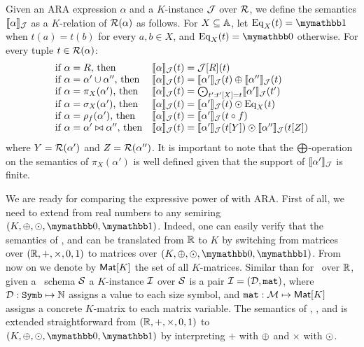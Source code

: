Given an ARA expression $\alpha$ and a $K$-instance $\mathcal{J}$ over $\mathcal{R}$, we define the semantics $\llbracket \alpha \rrbracket_{\mathcal{J}}$ as a $K$-relation of $\mathcal{R}(\alpha)$ as follows. For $X \subseteq \mathbb{A}$, let $\operatorname{Eq}_X(t) = \kone$ when $t(a) = t(b)$ for every $a, b \in X$, and $\operatorname{Eq}_X(t) = \kzero$ otherwise. For every tuple $t \in \mathcal{R}(\alpha)$:
$$
\begin{array}{ll}
\text{if $\alpha = R$, then} & \llbracket \alpha \rrbracket_{\mathcal{J}}(t) = \mathcal{J}[R](t) \\
\text{if $\alpha = \alpha' \cup \alpha''$, then} & \llbracket \alpha \rrbracket_{\mathcal{J}}(t) = \llbracket \alpha' \rrbracket_{\mathcal{J}}(t) \oplus \llbracket \alpha'' \rrbracket_{\mathcal{J}}(t)  \\
\text{if $\alpha = \pi_X(\alpha')$, then} & \llbracket \alpha \rrbracket_{\mathcal{J}}(t) = \bigodot_{t': t'[X] = t} \llbracket \alpha' \rrbracket_{\mathcal{J}}(t') \\
\text{if $\alpha = \sigma_X(\alpha')$, then} & \llbracket \alpha \rrbracket_{\mathcal{J}}(t) = 
\llbracket \alpha' \rrbracket_{\mathcal{J}}(t) \odot \operatorname{Eq}_X(t)  \\
\text{if $\alpha = \rho_f(\alpha')$, then} & \llbracket \alpha \rrbracket_{\mathcal{J}}(t) = 
\llbracket \alpha' \rrbracket_{\mathcal{J}}(t \circ f)  
\\
\text{if $\alpha = \alpha' \bowtie \alpha''$, then} & \llbracket \alpha \rrbracket_{\mathcal{J}}(t) =  \llbracket \alpha' \rrbracket_{\mathcal{J}}(t[Y]) \odot  \llbracket \alpha'' \rrbracket_{\mathcal{J}}(t[Z])
\end{array}
$$
where $Y = \mathcal{R}(\alpha')$ and $Z = \mathcal{R}(\alpha'')$. It is important to note that the $\bigoplus$-operation on the semantics of $\pi_X(\alpha')$ is well defined given that the support of $\llbracket \alpha' \rrbracket_{\mathcal{J}}$ is finite. 

We are ready for comparing the expressive power of \langsum with ARA. First of all, we need to extend \langsum from real numbers to any semiring $(K, \ksum, \kprod, \kzero, \kone)$. Indeed, one can easily verify that the semantics of \lang, \langfor and \langsum can be translated from $\mathbb{R}$ to $K$ by switching from matrices over $(\mathbb{R}, +, \times, 0, 1)$ to matrices over $(K, \ksum, \kprod, \kzero, \kone)$.
From now on we denote by  $\textsf{Mat}[K]$ the set of all $K$-matrices. Similar than for \lang\ over $\mathbb{R}$, given a \lang\ schema $\mathcal{S}$ a $K$-instance $\mathcal{I}$ over $\mathcal{S}$ is a pair $\mathcal{I} = (\mathcal{D},\texttt{mat})$, where $\mathcal{D} : \texttt{Symb} \mapsto \mathbb{N}$ assigns a value to each size symbol, and $\texttt{mat} : \mathcal{M} \mapsto \textsf{Mat}[K]$ assigns a concrete $K$-matrix to each matrix variable. The semantics of \lang, \langfor, and \langsum is extended straightforward from $(\mathbb{R}, +, \times, 0, 1)$ to $(K, \ksum, \kprod, \kzero, \kone)$ by interpreting $+$ with $\oplus$ and $\times$ with $\odot$. 

